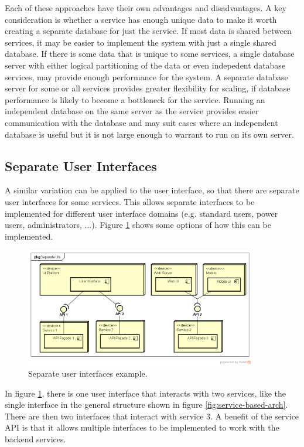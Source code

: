 Each of these approaches have their own advantages and disadvantages.
A key consideration is whether a service has enough unique data to make it worth creating a separate database for just the service.
If most data is shared between services, it may be easier to implement the system with just a single shared database.
If there is some data that is unique to some services, a single database server
with either logical partitioning of the data or even indepedent database services,
may provide enough performance for the system.
A separate database server for some or all services provides greater flexibility for scaling,
if database performance is likely to become a bottleneck for the service.
Running an independent database on the same server as the service provides easier communication with the database
and may suit cases where an independent database is useful but it is not large enough to warrant to run on its own server.

\subsection{Separate User Interfaces}

A similar variation can be applied to the user interface, so that there are separate user interfaces for some services.
This allows separate interfaces to be implemented for different user interface domains
(e.g. standard users, power users, administrators, ...).
Figure \ref{fig:separate-uis} shows some options of how this can be implemented.

\begin{figure}[h!]
    \centering
    \includegraphics[trim=40 42 19 45,clip,width=0.9\textwidth]{diagrams/separate-uis.png}
    \caption{Separate user interfaces example.}
    \label{fig:separate-uis}
\end{figure}

In figure \ref{fig:separate-uis}, there is one user interface that interacts with two services,
like the single interface in the general structure shown in figure \ref{fig:service-based-arch}.
There are then two interfaces that interact with service 3.
A benefit of the service API is that it allows multiple interfaces to be implemented to work with the backend services.

